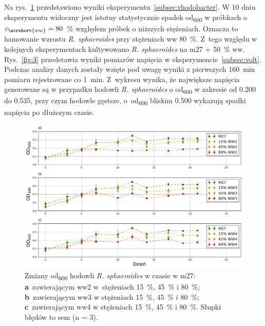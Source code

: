 Na rys.~\ref{fig:2} przedstawiono wyniki
eksperymentu~\ref{subsec:rhodobacter}.
W 10 dniu eksperymentu widoczny jest istotny
statystycznie spadek \acrshort{od}\textsubscript{600}
w próbkach o $c_{\acrshort{ww}} = 80$~\% względem próbek
o niższych stężeniach.
Oznacza to hamowanie wzrostu \textit{R. sphaeroides}
przy stężeniach \acrshort{ww} 80~\%.
Z~tego względu w kolejnych eksperymentach kultywowano
\textit{R. sphaeroides} na \acrshort{m27} + 50~\% \acrshort{ww}\@.\\

Rys.~\ref{fig:3} przedstawia wyniki pomiarów
napięcia w eksperymencie~\ref{subsec:volt}.
Podczas analizy danych zostały wzięte pod uwagę wyniki
z pierwszych 160~min pomiaru rejestrowane co 1~min.
Z~wykresu wynika, że największe napięcia generowane
są w przypadku hodowli \textit{R. sphaeroides}
o \acrshort{od}\textsubscript{600} w zakresie od 0.200 do 0.535,
przy czym hodowle gęstsze, o~\acrshort{od}\textsubscript{600} bliskim
0.500 wykazują spadki napięcia po dłuższym czasie.

\begin{figure}[t!]
    \centering
    \includegraphics[width=14cm]{figures/ww}
    \caption{
        Zmiany \acrshort{od}\textsubscript{600} hodowli \textit{R. sphaeroides}
        w czasie w \acrshort{m27}:
        \textbf{a}~zawierającym \acrshort{ww}2 w~stężeniach 15~\%, 45~\% i 80~\%;
        \textbf{b}~zawierającym \acrshort{ww}3 w stężeniach 15~\%, 45~\% i 80~\%;
        \textbf{c}~zawierającym \acrshort{ww}4 w stężeniach 15~\%, 45~\% i 80~\%.
        Słupki błędów to \acrshort{sem} (n = 3).
    }
    \label{fig:2}
\end{figure}

\vspace{5cm}

